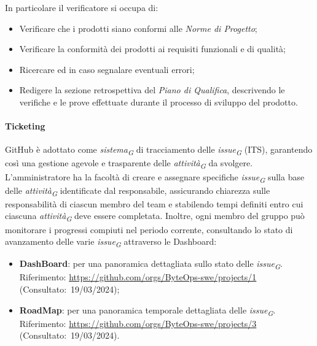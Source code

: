 In particolare il verificatore si occupa di:
\begin{itemize}
	\item Verificare che i prodotti siano conformi alle \textit{Norme di Progetto};
	\item Verificare la conformità dei prodotti ai requisiti funzionali e di qualità;
	\item Ricercare ed in caso segnalare eventuali errori;
	\item Redigere la sezione retrospettiva del \textit{Piano di Qualifica}, descrivendo le verifiche e le prove effettuate durante il processo di sviluppo del prodotto.
\end{itemize}

\hypertarget{par:ticketing}{\paragraph{Ticketing}}
GitHub è adottato come \textit{sistema}\textsubscript{\textit{G}} di tracciamento delle \textit{issue}\textsubscript{\textit{G}} (ITS), garantendo così una gestione agevole e trasparente delle \textit{attività}\textsubscript{\textit{G}} da svolgere. \\
L'amministratore ha la facoltà di creare e assegnare specifiche \textit{issue}\textsubscript{\textit{G}} sulla base delle \textit{attività}\textsubscript{\textit{G}} identificate dal responsabile, assicurando chiarezza sulle responsabilità di ciascun membro del team e stabilendo tempi definiti entro cui ciascuna \textit{attività}\textsubscript{\textit{G}} deve essere completata. Inoltre, ogni membro del gruppo può monitorare i progressi compiuti nel periodo corrente, consultando lo stato di avanzamento delle varie \textit{issue}\textsubscript{\textit{G}} attraverso le Dashboard:
\begin{itemize}
		\item \textbf{DashBoard}: per una panoramica dettagliata sullo stato delle \textit{issue}\textsubscript{\textit{G}}. \\
		Riferimento: \url{https://github.com/orgs/ByteOps-swe/projects/1} (Consultato:~19/03/2024);
		\item \textbf{RoadMap}: per una panoramica temporale dettagliata delle \textit{issue}\textsubscript{\textit{G}}. \\
		Riferimento: \url{https://github.com/orgs/ByteOps-swe/projects/3} (Consultato:~19/03/2024).
\end{itemize}

